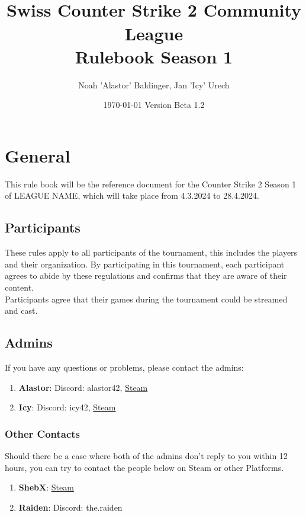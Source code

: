 \documentclass{article}
\title{\name\\ Swiss Counter Strike 2 Community League\\Rulebook Season 1}
\author{Noah 'Alastor' Baldinger, Jan 'Icy' Urech}
\date{\today \hspace{1cm} Version Beta 1.2} %
\def\name{LEAGUE NAME}
\begin{document}
\maketitle
\tableofcontents

\pagebreak
\section{General}
This rule book will be the reference document for the Counter Strike 2 Season 1 of \name, which will take place from 4.3.2024 to 28.4.2024. 

\subsection{Participants}
These rules apply to all participants of the tournament, this includes the players and their organization. By participating in this tournament, each participant agrees to abide by these regulations and confirms that they are aware of their content.\\
Participants agree that their games during the tournament could be streamed and cast.


\subsection{Admins}\label{admins}
If you have any questions or problems, please contact the admins:
\begin{enumerate}
    \item \textbf{Alastor}: Discord: alastor42, \href{https://steamcommunity.com/id/-rotsala-/}{Steam}
    \item \textbf{Icy}: Discord: icy42, \href{https://steamcommunity.com/id/icyq}{Steam}
\end{enumerate}
\subsubsection{Other Contacts}
Should there be a case where both of the admins don't reply to you within 12 hours, you can try to contact the people below on 
Steam or other Platforms.
\begin{enumerate}
    \item \textbf{ShebX}: \href{https://steamcommunity.com/id/ShebX}{Steam}
    \item \textbf{Raiden}: Discord: the.raiden
\end{enumerate}
\end{document}
